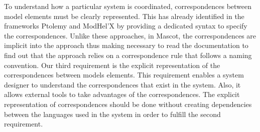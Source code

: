 




To understand how a particular system is coordinated, correspondences between model elements must be clearly represented. This has already identified in the frameworks Ptolemy and ModHel'X by providing a dedicated syntax to specify the correspondences. Unlike these approaches, in Mascot, the correspondences are implicit into the approach thus making necessary to read the documentation to find out that the approach relies on a correspondence rule that follows a naming convention. Our third requirement is the explicit representation of the correspondences between models elements. This requirement enables a system designer to understand the correspondences that exist in the system. Also, it allows external tools to take advantages of the correspondences. The explicit representation of correspondences should be done without creating dependencies between the languages used in the system in order to fulfill the second requirement.%
	
	
